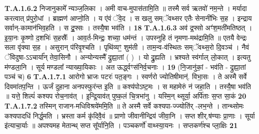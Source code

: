 \documentclass[17pt]{extarticle}
\begin{document}
                  \newline
                                                                  \textbf{ T.A.1.6.2} \newline
                  निजानुकामे᳚ न्यञ्ज॒लिका । अमी वाच-मुपास॑तामि॒ति ॥  तस्मै सर्व ऋतवो॑ नम॒न्ते । मर्यादा करत्वात् प्र॑पुरो॒धां । ब्राह्मण॑ आप्नो॒ति । य ए॑वं ॅवे॒द ।  स खलु सम्ॅवथ्सर एतैः सेनानी॑भिः स॒ह ।  इन्द्राय सर्वान्-कामान॑भिव॒हति । स द्र॒॒फ्सः ।  तस्यै॒षा भव॑ति । \textbf{ 18} \newline
                  \newline
                                                                  \textbf{ T.A.1.6.3} \newline
                  अव॑ द्र॒फ्सो अꣳ॑श॒मती॑मतिष्ठत् । इ॒या॒नः कृ॒ष्णो द॒शभिः॑ स॒हस्रैः᳚ ।  आव॒र्त-मिन्द्रः॒ शच्या॒ धम॑न्तं । उपस्नुहि तं नृमणा-मथ॑द्रामि॒ति ॥ एतयै वेन्द्रः सला वृ॑क्या स॒ह । असुरान् प॑रिवृ॒श्चति । पृथि॑व्यꣳ॒॒ शुम॑ती । ताम॒न्व-व॑स्थितः सम्ॅवथ्स॒रो दि॒वञ्च॑ ।  नैवं ॅविदुषा-ऽऽचार्या᳚न् तेवा॒सिनौ । अन्योन्यस्मै᳚ द्रुह्या॒तां ( ) । यो द्रु॒ह्यति । भ्रश्यते स्व॑र्गाल् लो॒कात् । इत्यतु म॑ण्डला॒नि । सूर्य मण्डला᳚ न्याख्या॒यिकाः । अत ऊर्द्ध्वꣳस॑निर्व॒चनाः । \textbf{ 19} \newline
                  \newline
                                                        (नि॒जानु॑कां॒ - भव॑ति - द्रुह्या॒तां पञ्च॑ च) \textbf{6} \newline \newline
                                \textbf{ T.A.1.7.1} \newline
                  आरोगो भ्राजः पटरः॑ पत॒ङ्गः । स्वर्णरो ज्योतिषीमान्॑. विभा॒सः । ते अस्मै सर्वे दिवमा॑तप॒न्ति । ऊर्जं दुहाना अनपस्फुर॑न्त इ॒ति ॥ कश्य॑पोऽष्ट॒मः । स महामेरुं न॑ जहा॒ति । तस्यै॒षा भव॑ति ॥ यत्ते॒ शिल्पं॑ कश्यप रोच॒नाव॑त् । इ॒न्द्रि॒याव॑त् पुष्क॒लं चि॒त्रभा॑नु ।  यस्मि॒न् थ्सूर्या॒ अर्पि॑ताः स॒प्त सा॒कं \textbf{ 20} \newline
                  \newline
                                                                  \textbf{ T.A.1.7.2} \newline
                  तस्मिन् राजान-मधिविश्रये॑ममि॒ति ॥ ते अस्मै सर्वे कश्यपा-ज्ज्योति॑र् -लभ॒न्ते । तान्थ्सोमः कश्यपादधि॑ निर्द्ध॒मति । भ्रस्ता कर्म कृ॑दिवै॒वं ॥ प्राणो जीवानीन्द्रिय॑ जीवा॒नि । सप्त शीर्.ष॑ण्याः प्रा॒णाः ।  सूर्या इ॑त्याचा॒र्याः ॥ अपश्यमह मेतान्थ् सप्त सू᳚र्यानि॒ति । पञ्चकर्णो॑ वाथ्स्या॒यनः । सप्तकर्ण॑श्च प्ला॒क्षिः \textbf{ 21} \newline
\end{document}
